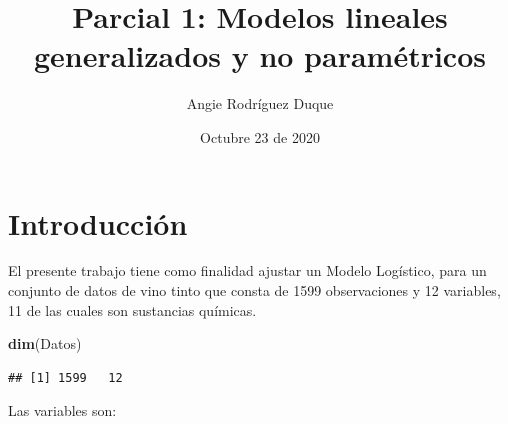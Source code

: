 \documentclass[
]{article}
\title{Parcial 1: Modelos lineales generalizados y no paramétricos}
\author{Angie Rodríguez Duque}
\date{Octubre 23 de 2020}
\newenvironment{Shaded}{\begin{snugshade}}{\end{snugshade}}
\newcommand{\KeywordTok}[1]{\textcolor[rgb]{0.13,0.29,0.53}{\textbf{#1}}}
\newcommand{\NormalTok}[1]{#1}
\begin{document}
\maketitle

\hypertarget{introducciuxf3n}{%
\section{Introducción}\label{introducciuxf3n}}

El presente trabajo tiene como finalidad ajustar un Modelo Logístico,
para un conjunto de datos de vino tinto que consta de 1599 observaciones
y 12 variables, 11 de las cuales son sustancias químicas.

\begin{Shaded}
\begin{Highlighting}[]
\KeywordTok{dim}\NormalTok{(Datos)}
\end{Highlighting}
\end{Shaded}

\begin{verbatim}
## [1] 1599   12
\end{verbatim}

Las variables son:
\end{document}
